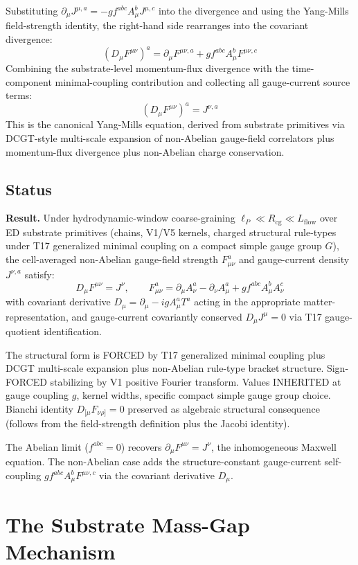 \documentclass[11pt,a4paper]{article}
\begin{document}
Substituting $\partial_\mu J^{\mu,a} = -g f^{abc} A_\mu^b J^{\mu,c}$ into the divergence and using the Yang-Mills field-strength identity, the right-hand side rearranges into the covariant divergence:
\[
(D_\mu F^{\mu\nu})^a = \partial_\mu F^{\mu\nu,a} + g f^{abc} A_\mu^b F^{\mu\nu,c}
\]
Combining the substrate-level momentum-flux divergence with the time-component minimal-coupling contribution and collecting all gauge-current source terms:
\[
(D_\mu F^{\mu\nu})^a = J^{\nu,a}
\]
This is the canonical Yang-Mills equation, derived from substrate primitives via DCGT-style multi-scale expansion of non-Abelian gauge-field correlators plus momentum-flux divergence plus non-Abelian charge conservation.

\subsection{Status}

\textbf{Result.} Under hydrodynamic-window coarse-graining $\ell_P \ll R_\mathrm{cg} \ll L_\mathrm{flow}$ over ED substrate primitives (chains, V1/V5 kernels, charged structural rule-types under T17 generalized minimal coupling on a compact simple gauge group $G$), the cell-averaged non-Abelian gauge-field strength $F_{\mu\nu}^a$ and gauge-current density $J^{\nu,a}$ satisfy:
\[
D_\mu F^{\mu\nu} = J^\nu, \qquad F_{\mu\nu}^a = \partial_\mu A_\nu^a - \partial_\nu A_\mu^a + g f^{abc} A_\mu^b A_\nu^c
\]
with covariant derivative $D_\mu = \partial_\mu - ig A_\mu^a T^a$ acting in the appropriate matter-representation, and gauge-current covariantly conserved $D_\mu J^\mu = 0$ via T17 gauge-quotient identification.

The structural form is FORCED by T17 generalized minimal coupling plus DCGT multi-scale expansion plus non-Abelian rule-type bracket structure. Sign-FORCED stabilizing by V1 positive Fourier transform. Values INHERITED at gauge coupling $g$, kernel widths, specific compact simple gauge group choice. Bianchi identity $D_{[\mu} F_{\nu\rho]} = 0$ preserved as algebraic structural consequence (follows from the field-strength definition plus the Jacobi identity).

The Abelian limit ($f^{abc} = 0$) recovers $\partial_\mu F^{\mu\nu} = J^\nu$, the inhomogeneous Maxwell equation. The non-Abelian case adds the structure-constant gauge-current self-coupling $g f^{abc} A_\mu^b F^{\mu\nu,c}$ via the covariant derivative $D_\mu$.

\section{The Substrate Mass-Gap Mechanism}
\end{document}
